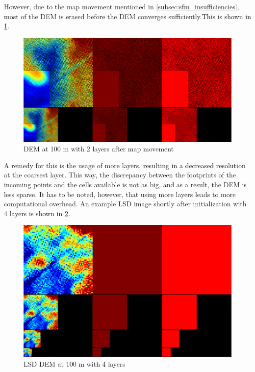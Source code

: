 \clearpage%

However, due to the map movement mentioned in \cref{subsec:sfm_insufficiencies}, most of the DEM is erased before the DEM converges sufficiently.This is shown in \cref{fig:lsd_2_layers_3}. 

\begin{figure}[h]
\centering
\includegraphics[scale=0.24]{images/evaluation/2_layers_3.png}
\caption{DEM at 100 m with 2 layers after map movement}
\label{fig:lsd_2_layers_3}
\end{figure}

A remedy for this is the usage of more layers, resulting in a decreased resolution at the coarsest layer. This way, the discrepancy between the footprints of the incoming points and the cells available is not as big, and as a result, the DEM is less sparse. It has to be noted, however, that using more layers leads to more computational overhead. An example LSD image shortly after initialization with 4 layers is shown in \cref{fig:lsd_4_layers_1}.

\begin{figure}[h]
\centering
\includegraphics[scale=0.24]{images/evaluation/4_layers_1.png}
\caption{LSD DEM at 100 m with 4 layers}
\label{fig:lsd_4_layers_1}
\end{figure}

